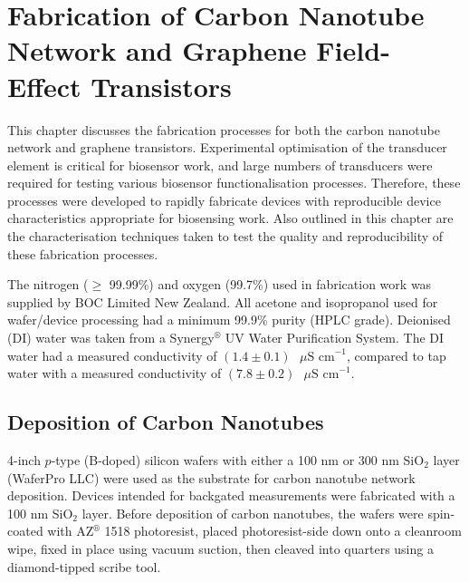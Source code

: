 \documentclass[
  letterpaper,
  DIV=11,
  numbers=noendperiod]{scrartcl}
\author{}
\date{}
\begin{document}
\ifdefined\Shaded\renewenvironment{Shaded}{\begin{tcolorbox}[frame hidden, interior hidden, breakable, borderline west={3pt}{0pt}{shadecolor}, boxrule=0pt, enhanced, sharp corners]}{\end{tcolorbox}}\fi

\hypertarget{sec-fabrication}{%
\section{Fabrication of Carbon Nanotube Network and Graphene
Field-Effect Transistors}\label{sec-fabrication}}

This chapter discusses the fabrication processes for both the carbon
nanotube network and graphene transistors. Experimental optimisation of
the transducer element is critical for biosensor work, and large numbers
of transducers were required for testing various biosensor
functionalisation processes. Therefore, these processes were developed
to rapidly fabricate devices with reproducible device characteristics
appropriate for biosensing work. Also outlined in this chapter are the
characterisation techniques taken to test the quality and
reproducibility of these fabrication processes.

The nitrogen (\(\geq\) 99.99\%) and oxygen (99.7\%) used in fabrication
work was supplied by BOC Limited New Zealand. All acetone and
isopropanol used for wafer/device processing had a minimum 99.9\% purity
(HPLC grade). Deionised (DI) water was taken from a
Synergy\(^\circledR\) UV Water Purification System. The DI water had a
measured conductivity of
\((1.4\pm0.1)\textrm{ } \mu \textrm{S cm}^{-1}\), compared to tap water
with a measured conductivity of
\((7.8\pm0.2)\textrm{ } \mu \textrm{S cm}^{-1}\).

\hypertarget{sec-dep-carbon-nanotubes}{%
\subsection{Deposition of Carbon
Nanotubes}\label{sec-dep-carbon-nanotubes}}

4-inch \(p\)-type (B-doped) silicon wafers with either a 100 nm or 300
nm SiO\(_2\) layer (WaferPro LLC) were used as the substrate for carbon
nanotube network deposition. Devices intended for backgated measurements
were fabricated with a 100 nm SiO\(_2\) layer. Before deposition of
carbon nanotubes, the wafers were spin-coated with AZ\(^\circledR\) 1518
photoresist, placed photoresist-side down onto a cleanroom wipe, fixed
in place using vacuum suction, then cleaved into quarters using a
diamond-tipped scribe tool.
\end{document}
